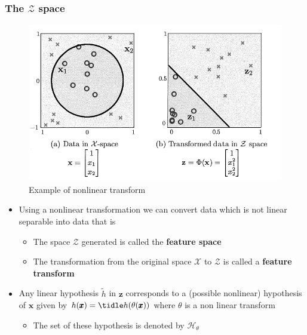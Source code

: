 \documentclass[11pt]{article}
\begin{document}
\subsubsection{The \(\mathcal Z\) space}
\label{sec:orgdd75e98}
\begin{figure}[htbp]
\centering
\includegraphics[width=.9\linewidth]{The Linear Model/screenshot_2018-09-03_18-22-01.png}
\caption{\label{fig:orgd93abf9}
Example of nonlinear transform}
\end{figure}
\begin{itemize}
\item Using a nonlinear transformation we can convert data which is not linear separable into data that is
\begin{itemize}
\item The space \(\mathcal Z\) generated is called the \textbf{feature space}
\item The transformation from the original space \(\mathcal X\) to \(\mathcal Z\) is called a \textbf{feature transform}
\end{itemize}

\item Any linear hypothesis \(\tilde h\) in \(\pmb z\) corresponds to a (possible nonlinear) hypothesis of
\(\pmb x\) given by \(h(\pmb x) = \tidle h (\theta(\pmb x))\) where \(\theta\) is a non linear transform
\begin{itemize}
\item The set of these hypothesis is denoted by \(\mathcal H_\theta\)
\end{itemize}
\end{itemize}
\end{document}
